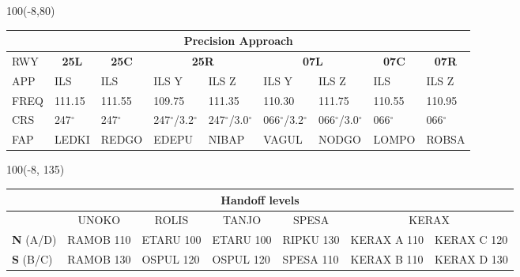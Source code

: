 \documentclass[10pt,landscape,a4paper]{article}
\begin{document}
\begin{textblock}{100}(-8,80)
\begin{table}[]
\begin{tabular}{|l|l|l|l|l|l|l|l|l|}
\multicolumn{9}{c}{\textbf{Precision Approach}}                                                                                                                                                                            \\ \hline
RWY  & \multicolumn{1}{c|}{\textbf{25L}} & \multicolumn{1}{c|}{\textbf{25C}} & \multicolumn{2}{c|}{\textbf{25R}} & \multicolumn{2}{c|}{\textbf{07L}} & \multicolumn{1}{c|}{\textbf{07C}} & \multicolumn{1}{c|}{\textbf{07R}} \\ \hline
APP  & ILS                               & ILS                               & ILS Y           & ILS Z           & ILS Y           & ILS Z           & ILS                               & ILS Z                             \\
FREQ & 111.15                            & 111.55                            & 109.75          & 111.35          & 110.30          & 111.75          & 110.55                            & 110.95                            \\
CRS  & 247$^\circ$                       & 247$^\circ$                              & 247$^\circ$/3.2$^\circ$       & 247$^\circ$/3.0$^\circ$       & 066$^\circ$/3.2$^\circ$       & 066$^\circ$/3.0$^\circ$       & 066$^\circ$                              & 066$^\circ$                              \\
FAP  & LEDKI                             & REDGO                             & EDEPU           & NIBAP           & VAGUL           & NODGO           & LOMPO                             & ROBSA                             \\ \hline
\end{tabular}
\end{table}
\end{textblock}


\begin{textblock}{100}(-8, 135)
\begin{table}[]
\begin{tabular}{|l|l|l|l||l|l|l|}
\multicolumn{7}{c}{\textbf{Handoff levels}}  \\ \hline
           & \multicolumn{1}{c|}{UNOKO}     & \multicolumn{1}{c|}{ROLIS}    & \multicolumn{1}{c||}{TANJO} & \multicolumn{1}{c|}{SPESA}   &   \multicolumn{2}{c|}{KERAX} \\ \hline
\textbf{N} (A/D) & RAMOB 110 & ETARU 100 & ETARU 100 & RIPKU 130 & KERAX A 110 & KERAX C 120\\
\textbf{S} (B/C) & RAMOB 130 & OSPUL 120 & OSPUL 120 & SPESA 110 & KERAX B 110 & KERAX D 130\\ \hline
\end{tabular}
\end{table}
\end{textblock}
\end{document}
